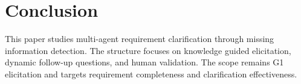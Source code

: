 \section{Conclusion}
\label{conclusion}

This paper studies multi-agent requirement clarification through missing information detection.
The structure focuses on knowledge guided elicitation, dynamic follow-up questions, and human validation.
The scope remains G1 elicitation and targets requirement completeness and clarification effectiveness.
